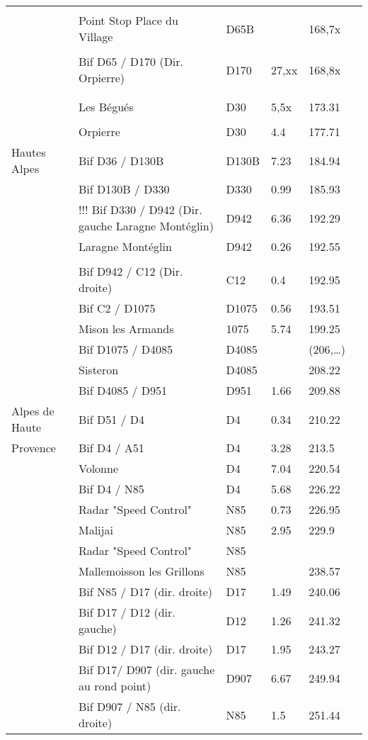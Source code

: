 \documentclass{article}%
\begin{document}
\begin{longtable}{p{2.25cm}|p{7.0cm}|p{1.5cm}|p{1.5cm}|p{1.5cm}|p{3.5cm}}
 & & & & & \\%
 &Point Stop Place du Village&D65B& &168,7x& \\%
 & & & & & \\%
 &Bif D65 / D170  (Dir. Orpierre)&D170&27,xx&168,8x& \\%
 & & & & & \\%
\hline& & & & & \\%
 &Les Bégués &D30&5,5x&173.31& \\%
 & & & & & \\%
 &Orpierre&D30&4.4&177.71& \\%
Hautes Alpes&Bif D36 / D130B&D130B&7.23&184.94& \\%
 &Bif D130B / D330&D330&0.99&185.93& \\%
 &!!! Bif D330 / D942 (Dir. gauche Laragne Montéglin)&D942&6.36&192.29& \\%
 &Laragne Montéglin&D942 &0.26&192.55& \\%
\hline& & & & & \\%
 &Bif D942 / C12 (Dir. droite)&C12&0.4&192.95& \\%
 &Bif C2 / D1075&D1075&0.56&193.51& \\%
 &Mison les Armands&1075&5.74&199.25& \\%
 &Bif D1075 / D4085&D4085& &(206,…)& \\%
 &Sisteron&D4085& &208.22& \\%
 &Bif D4085 / D951&D951&1.66&209.88& \\%
Alpes de Haute&Bif D51 / D4&D4&0.34&210.22& \\%
Provence&Bif D4 / A51 &D4&3.28&213.5& \\%
 &Volonne&D4&7.04&220.54& \\%
 &Bif D4 / N85&D4&5.68&226.22& \\%
 &Radar "Speed Control"&N85&0.73&226.95& \\%
 &Malijai&N85&2.95&229.9& \\%
 &Radar "Speed Control"&N85& & & \\%
 &Mallemoisson les Grillons&N85& &238.57& \\%
 &Bif N85 / D17 (dir. droite)&D17&1.49&240.06& \\%
 &Bif D17 / D12 (dir. gauche)&D12&1.26&241.32& \\%
 &Bif D12 / D17 (dir. droite)&D17&1.95&243.27& \\%
 &Bif D17/ D907 (dir. gauche au rond point)&D907&6.67&249.94& \\%
 &Bif D907 / N85 (dir. droite)&N85&1.5&251.44& \\%

\end{longtable}
\end{document}
